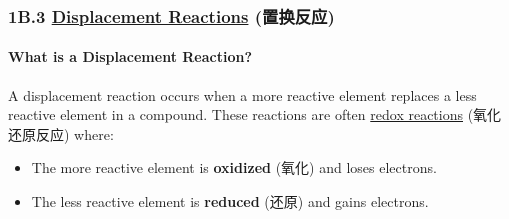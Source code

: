 
\subsubsection{1B.3 \underline{Displacement Reactions} (置换反应)}
\paragraph{What is a Displacement Reaction?} A displacement reaction occurs when a more reactive element replaces a less reactive
element in a compound. These reactions are often \underline{redox reactions} (氧化还原反应) where:
\begin{itemize}
    \item The more reactive element is \textbf{oxidized} (氧化) and loses electrons.
    \item The less reactive element is \textbf{reduced} (还原) and gains electrons.
\end{itemize}

